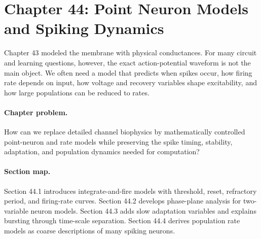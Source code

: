 \section{Chapter 44: Point Neuron Models and Spiking Dynamics}
\label{ch:point-neuron-models-spiking-dynamics}

Chapter 43 modeled the membrane with physical conductances. For many circuit and learning questions, however, the exact action-potential waveform is not the main object. We often need a model that predicts when spikes occur, how firing rate depends on input, how voltage and recovery variables shape excitability, and how large populations can be reduced to rates.

\paragraph{Chapter problem.}
How can we replace detailed channel biophysics by mathematically controlled point-neuron and rate models while preserving the spike timing, stability, adaptation, and population dynamics needed for computation?

\paragraph{Section map.}
Section 44.1 introduces integrate-and-fire models with threshold, reset, refractory period, and firing-rate curves. Section 44.2 develops phase-plane analysis for two-variable neuron models. Section 44.3 adds slow adaptation variables and explains bursting through time-scale separation. Section 44.4 derives population rate models as coarse descriptions of many spiking neurons.

